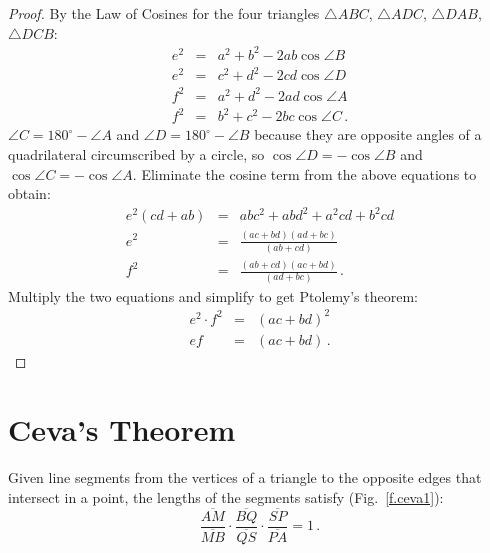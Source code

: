 \begin{proof}
By the Law of Cosines for the four triangles $\triangle ABC$, $\triangle ADC$, $\triangle DAB$, $\triangle DCB$:
\begin{eqnarray*}
e^2 &=& a^2 + b^2 - 2ab \cos \angle B\\
e^2 &=& c^2 + d^2 - 2cd \cos \angle D\\
f^2 &=& a^2 + d^2 - 2ad \cos \angle A\\
f^2 &=& b^2 + c^2 - 2bc \cos \angle C\,.
\end{eqnarray*}
$\angle C = 180^\circ - \angle A$ and $\angle D = 180^\circ - \angle B$ because they are opposite angles of a quadrilateral circumscribed by a circle, so $\cos \angle D = - \cos \angle B$ and $\cos \angle C = -\cos \angle A$. Eliminate the cosine term from the above equations to obtain:
\begin{eqnarray*}
e^2(cd+ab)&=&abc^2+abd^2+a^2cd+b^2cd\\
e^2 &=& \frac{(ac+bd)(ad+bc)}{(ab+cd)}\\
f^2 &=& \frac{(ab+cd)(ac+bd)}{(ad+bc)}\,.
\end{eqnarray*}
Multiply the two equations and simplify to get Ptolemy's theorem:
\begin{eqnarray*}
e^2\cdot f^2 &=& (ac+bd)^2\\
ef &=& (ac+bd)\,.
\end{eqnarray*}
\end{proof}


\section{Ceva's Theorem}\label{a.ceva}

\begin{theorem}[Ceva]
Given line segments from the vertices of a triangle to the opposite edges that intersect in a point, the lengths of the segments satisfy (Fig.~\ref{f.ceva1}):\label{thm.ceva}
\[
\frac{\overline{AM}}{\overline{MB}}\cdot\frac{\overline{BQ}}{\overline{QS}}\cdot\frac{\overline{SP}}{\overline{PA}} = 1\,.
\]
\end{theorem}

